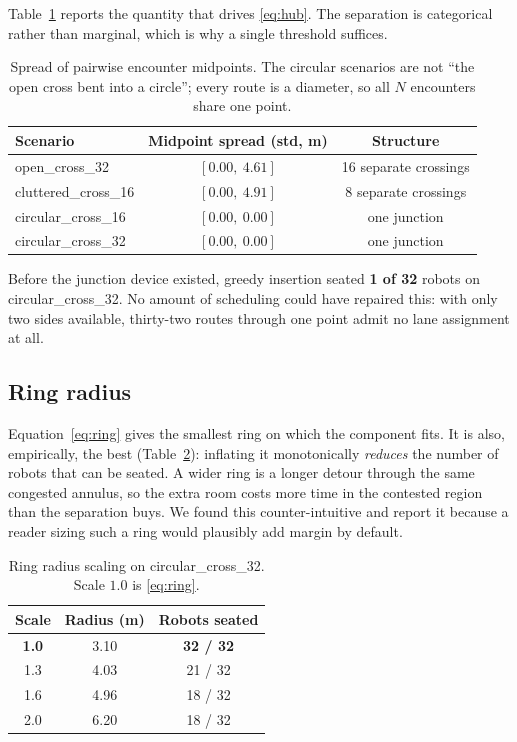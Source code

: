\documentclass[conference]{IEEEtran}
\begin{document}
Table~\ref{tab:spread} reports the quantity that drives \eqref{eq:hub}. The separation is
categorical rather than marginal, which is why a single threshold suffices.

\begin{table}[t]
\caption{Spread of pairwise encounter midpoints. The circular scenarios are not ``the open
cross bent into a circle''; every route is a diameter, so all $N$ encounters share one
point.}
\label{tab:spread}
\centering
\small
\begin{tabular}{@{}lcc@{}}
\toprule
Scenario & Midpoint spread (std, m) & Structure \\
\midrule
open\_cross\_32      & $[0.00,\ 4.61]$ & 16 separate crossings \\
cluttered\_cross\_16 & $[0.00,\ 4.91]$ & 8 separate crossings \\
circular\_cross\_16  & $[0.00,\ 0.00]$ & one junction \\
circular\_cross\_32  & $[0.00,\ 0.00]$ & one junction \\
\bottomrule
\end{tabular}
\end{table}

Before the junction device existed, greedy insertion seated \textbf{1 of 32} robots on
circular\_cross\_32. No amount of scheduling could have repaired this: with only two sides
available, thirty-two routes through one point admit no lane assignment at all.

\subsection{Ring radius}

Equation~\eqref{eq:ring} gives the smallest ring on which the component fits. It is also,
empirically, the best (Table~\ref{tab:pack}): inflating it monotonically \emph{reduces} the
number of robots that can be seated. A wider ring is a longer detour through the same
congested annulus, so the extra room costs more time in the contested region than the
separation buys. We found this counter-intuitive and report it because a reader sizing such
a ring would plausibly add margin by default.

\begin{table}[t]
\caption{Ring radius scaling on circular\_cross\_32. Scale $1.0$ is \eqref{eq:ring}.}
\label{tab:pack}
\centering
\small
\begin{tabular}{@{}ccc@{}}
\toprule
Scale & Radius (m) & Robots seated \\
\midrule
\textbf{1.0} & 3.10 & \textbf{32 / 32} \\
1.3 & 4.03 & 21 / 32 \\
1.6 & 4.96 & 18 / 32 \\
2.0 & 6.20 & 18 / 32 \\
\bottomrule
\end{tabular}
\end{table}
\end{document}
